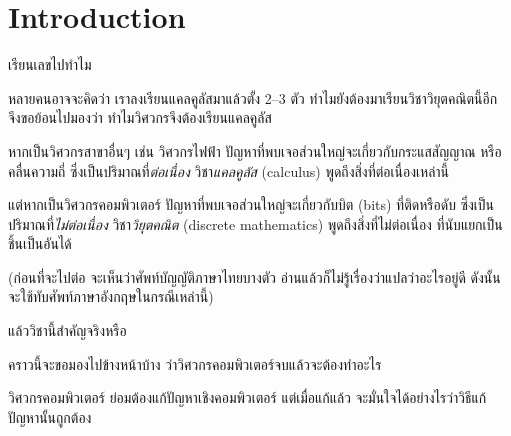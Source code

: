 \chapter{Introduction}
เรียนเลขไปทำไม

หลายคนอาจจะคิดว่า เราลงเรียนแคลคูลัสมาแล้วตั้ง 2--3 ตัว ทำไมยังต้องมาเรียนวิชาวิยุตคณิตนี้อีก จึงขอย้อนไปมองว่า ทำไมวิศวกรจึงต้องเรียนแคลคูลัส

หากเป็นวิศวกรสาขาอื่นๆ เช่น วิศวกรไฟฟ้า ปัญหาที่พบเจอส่วนใหญ่จะเกี่ยวกับกระแสสัญญาณ หรือคลื่นความถี่ ซึ่งเป็นปริมาณที่\emph{ต่อเนื่อง} วิชา\emph{แคลคูลัส} (calculus) พูดถึงสิ่งที่ต่อเนื่องเหล่านี้

แต่หากเป็นวิศวกรคอมพิวเตอร์ ปัญหาที่พบเจอส่วนใหญ่จะเกี่ยวกับบิต (bits) ที่ติดหรือดับ ซึ่งเป็นปริมาณที่\emph{ไม่ต่อเนื่อง} วิชา\emph{วิยุตคณิต} (discrete mathematics) พูดถึงสิ่งที่ไม่ต่อเนื่อง ที่นับแยกเป็นชิ้นเป็นอันได้

(ก่อนที่จะไปต่อ จะเห็นว่าศัพท์บัญญัติภาษาไทยบางตัว อ่านแล้วก็ไม่รู้เรื่องว่าแปลว่าอะไรอยู่ดี ดังนั้น จะใช้ทับศัพท์ภาษาอังกฤษในกรณีเหล่านี้)

แล้ววิชานี้สำคัญจริงหรือ

คราวนี้จะขอมองไปข้างหน้าบ้าง ว่าวิศวกรคอมพิวเตอร์จบแล้วจะต้องทำอะไร

วิศวกรคอมพิวเตอร์ ย่อมต้องแก้ปัญหาเชิงคอมพิวเตอร์ แต่เมื่อแก้แล้ว จะมั่นใจได้อย่างไรว่าวิธีแก้ปัญหานั้นถูกต้อง

